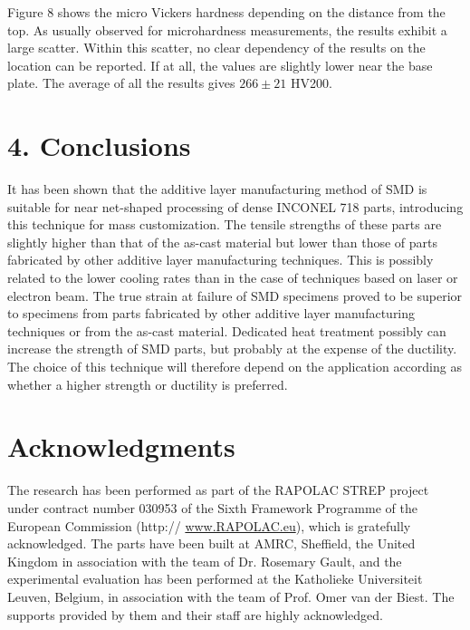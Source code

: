 \documentclass[10pt]{article}
\begin{document}
Figure 8 shows the micro Vickers hardness depending on the distance from the top. As usually observed for microhardness measurements, the results exhibit a large scatter. Within this scatter, no clear dependency of the results on the location can be reported. If at all, the values are slightly lower near the base plate. The average of all the results gives $266 \pm 21$ HV200.

\section*{4. Conclusions}
It has been shown that the additive layer manufacturing method of SMD is suitable for near net-shaped processing of dense INCONEL 718 parts, introducing this technique for mass customization. The tensile strengths of these parts are slightly higher than that of the as-cast material but lower than those of parts fabricated by other additive layer manufacturing techniques. This is possibly related to the lower cooling rates than in the case of techniques based on laser or electron beam. The true strain at failure of SMD specimens proved to be superior to specimens from parts fabricated by other additive layer manufacturing techniques or from the as-cast material. Dedicated heat treatment possibly can increase the strength of SMD parts, but probably at the expense of the ductility. The choice of this technique will therefore depend on the application according as whether a higher strength or ductility is preferred.

\section*{Acknowledgments}
The research has been performed as part of the RAPOLAC STREP project under contract number 030953 of the Sixth Framework Programme of the European Commission (http:// \href{http://www.RAPOLAC.eu}{www.RAPOLAC.eu}), which is gratefully acknowledged. The parts have been built at AMRC, Sheffield, the United Kingdom in association with the team of Dr. Rosemary Gault, and the experimental evaluation has been performed at the Katholieke Universiteit Leuven, Belgium, in association with the team of Prof. Omer van der Biest. The supports provided by them and their staff are highly acknowledged.
\end{document}
